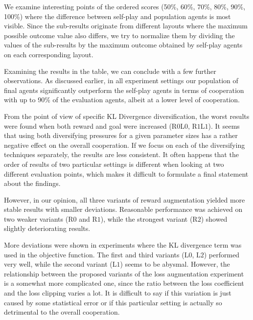 We examine interesting points of the ordered scores (50\%, 60\%, 70\%, 80\%, 90\%, 100\%) where the difference between self-play and population agents is most visible.
Since the sub-results originate from different layouts where the maximum possible outcome value also differs, we try to normalize them by dividing the values of the sub-results by the maximum outcome obtained by self-play agents on each corresponding layout.

Examining the results in the table, we can conclude with a few further observations.
As discussed earlier, in all experiment settings our population of final agents significantly outperform the self-play agents in terms of cooperation with up to 90\% of the evaluation agents, albeit at a lower level of cooperation.

From the point of view of specific KL Divergence diversification, the worst results were found when both reward and goal were increased (R$0$L$0$, R$1$L$1$).
It seems that using both diversifying pressures for a given parameter sizes has a rather negative effect on the overall cooperation.
If we focus on each of the diversifying techniques separately, the results are less consistent.
It often happens that the order of results of two particular settings is different when looking at two different evaluation points, which makes it difficult to formulate a final statement about the findings.

However, in our opinion, all three variants of reward augmentation yielded more stable results with smaller deviations.
Reasonable performance was achieved on two weaker variants (R$0$ and R$1$), while the strongest variant (R$2$) showed slightly deteriorating results.

More deviations were shown in experiments where the KL divergence term was used in the objective function.
The first and third variants (L$0$, L$2$) performed very well, while the second variant (L$1$) seems to be abysmal.
However, the relationship between the proposed variants of the loss augmentation experiment is a somewhat more complicated one, since the ratio between the loss coefficient and the loss clipping varies a lot. 
It is difficult to say if this variation is just caused by some statistical error or if this particular setting is actually so detrimental to the overall cooperation.

